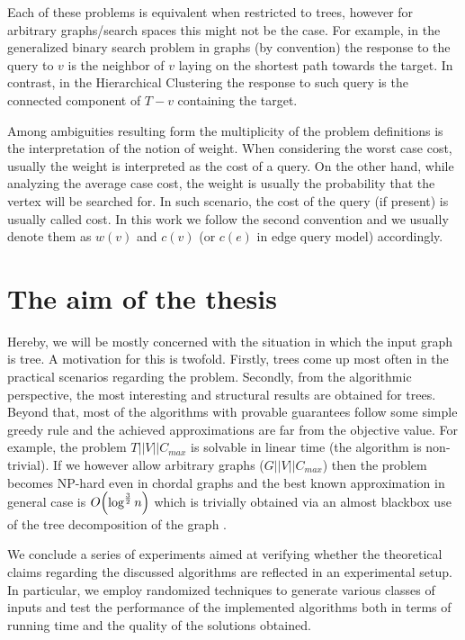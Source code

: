 Each of these problems is equivalent when restricted to trees, however for arbitrary graphs/search spaces this might not be the case. For example, in the generalized binary search problem in graphs (by convention) the response to the query to $v$ is the neighbor of $v$ laying on the shortest path towards the target. In contrast, in the Hierarchical Clustering the response to such query is the connected component of $T-v$ containing the target.
 
Among ambiguities resulting form the multiplicity of the problem definitions is the interpretation of the notion of weight. When considering the worst case cost, usually the weight is interpreted as the cost of a query. On the other hand, while analyzing the average case cost, the weight is usually the probability that the vertex will be searched for. In such scenario, the cost of the query (if present) is usually called cost. In this work we follow the second convention and we usually denote them as $w(v)$ and $c(v)$ (or $c(e)$ in edge query model) accordingly.

\section{The aim of the thesis}

Hereby, we will be mostly concerned with the situation in which the input graph is tree. A motivation for this is twofold. Firstly, trees come up most often in the practical scenarios regarding the problem. Secondly, from the algorithmic perspective, the most interesting and structural results are obtained for trees. Beyond that, most of the algorithms with provable guarantees follow some simple greedy rule and the achieved approximations are far from the objective value. For example, the problem $T||V||C_{max}$ is solvable in linear time (the algorithm is non-trivial)\cite{Schaffer1989OptNodeRankOfTsInLinTime}. If we however allow arbitrary graphs ($G||V||C_{max}$) then the problem becomes NP-hard even in chordal graphs \cite{DereniowskiVxRankOfChGsAndWTs} and the best known approximation in general case is $O\mathopen{}\left( \log^{\frac{3}{2}} n  \right)$ which is trivially obtained via an almost blackbox use of the tree decomposition of the graph \cite{RankingsofGraphs}. 

We conclude a series of experiments aimed at verifying whether the theoretical claims regarding the discussed algorithms are reflected in an experimental setup. In particular, we employ randomized techniques to generate various classes of inputs and test the performance of the implemented algorithms both in terms of running time and the quality of the solutions obtained.
